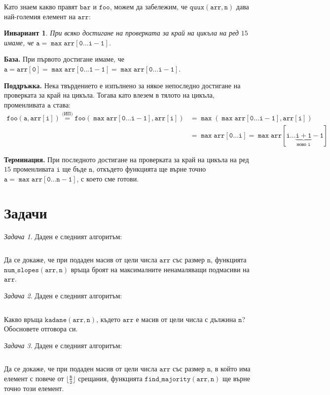 \documentclass{article}
\theoremstyle{definition}
\theoremstyle{plain}
\newtheorem*{invariant}{Инвариант}
\theoremstyle{remark}
\newtheorem{problem}{Задача}
\theoremstyle{definition}
\begin{document}
Като знаем какво правят $\mathtt{bar}$ и $\mathtt{foo}$, можем да забележим, че $\mathtt{quux(arr, n)}$ дава най-големия елемент на $\mathtt{arr}$:
\begin{invariant}
    При всяко достигане на проверката за край на цикъла на ред $15$ имаме, че $\mathtt{a = \max arr[0 \dots i - 1]}$.
\end{invariant}

\textbf{База.}
При първото достигане имаме, че $\mathtt{a = arr[0] = \max arr[0 \dots 1 - 1] = \max arr[0 \dots i - 1]}$.

\textbf{Поддръжка.}
Нека твърдението е изпълнено за някое непоследно достигане на проверката за край на цикъла.
Тогава като влезем в тялото на цикъла, променливата $\mathtt{a}$ става:
\begin{align*}
    \mathtt{foo(a, arr[i]) \stackrel{\text{(ИП)}}{=} foo(\max arr[0 \dots i - 1], arr[i])} & = \mathtt{\max (\max arr[0 \dots i - 1], arr[i])}                                                  \\
                                                                                           & =\mathtt{\max arr[0 \dots i] = \max arr[i \dots \underbrace{\mathtt{i + 1}}_{\text{ново } i} - 1]}
\end{align*}

\textbf{Терминация.}
При последното достигане на проверката за край на цикъла на ред $15$ променливата $\mathtt{i}$ ще бъде $\mathtt{n}$, откъдето функцията ще върне точно $\mathtt{a = \max arr[0 \dots n - 1]}$, с което сме готови.

\section*{Задачи}

\begin{problem}
Даден е следният алгоритъм:
\inputminted[linenos]{c++}{algorithms/num_slopes.cpp}

Да се докаже, че при подаден масив от цели числа $\mathtt{arr}$ със размер $\mathtt{n}$, функцията $\mathtt{num\_slopes(arr, n)}$ връща броят на максималните ненамаляващи подмасиви на $\mathtt{arr}$.
\end{problem}


\begin{problem}
Даден е следният алгоритъм:
\inputminted[linenos]{c++}{algorithms/kadane.cpp}

Какво връща $\mathtt{kadane(arr, n)}$, където $\mathtt{arr}$ е масив от цели числа с дължина $\mathtt{n}$?
Обосновете отговора си.
\end{problem}

\begin{problem}
Даден е следният алгоритъм:
\inputminted[linenos]{c++}{algorithms/find_majority.cpp}

Да се докаже, че при подаден масив от цели числа $\mathtt{arr}$ със размер $\mathtt{n}$, в който има елемент с повече от $\mathtt{\lfloor \frac{n}{2} \rfloor}$ срещания,
функцията $\mathtt{find\_majority(arr, n)}$ ще върне точно този елемент.
\end{problem}
\end{document}
